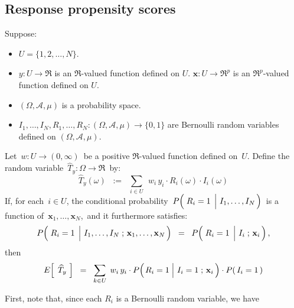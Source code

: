 

\subsection{Response propensity scores}

\begin{proposition}\label{PropnPropensityScore} 
\mbox{}\vskip 0.1cm
\noindent
Suppose:
\begin{itemize}
\item
	$U = \{1,2,\ldots,N\}$.
\item
	$y : U \longrightarrow \Re$ is an $\Re$-valued function defined on $U$.\;
	$\mathbf{x} : U \longrightarrow \Re^{p}$ is an $\Re^{p}$-valued function defined on $U$.
\item
	$(\Omega,\mathcal{A},\mu)$ is a probability space.
\item
	$I_{1},\ldots,I_{N},R_{1},\ldots,R_{N} : (\Omega,\mathcal{A},\mu) \longrightarrow \{0,1\}$
	are Bernoulli random variables defined on $(\Omega,\mathcal{A},\mu)$. 
\end{itemize}
Let \,$w : U \longrightarrow (0,\infty)$\, be a positive $\Re$-valued function defined on \,$U$.
Define the random variable \,$\widehat{T}_{y} : \Omega \longrightarrow \Re$\, by:
\begin{equation*}
\widehat{T}_{y}(\omega)
\;\; := \;\;
	\underset{i \in U}{\sum}\,\;w_{i}\,y_{i}\cdot R_{i}(\omega) \cdot I_{i}(\omega)
\end{equation*}
If, for each \,$i \in U$, the conditional probability
\,$P\!\left(\,\left.\overset{{\color{white}.}}{R_{i}}=1\;\,\right\vert\,I_{1},\ldots,I_{N}\,\right)$\,
is a function of \,$\mathbf{x}_{1},\ldots,\mathbf{x}_{N}$,\, and it furthermore satisfies:
\begin{equation*}
P\!\left(\,
	\left.\overset{{\color{white}.}}{R_{i}}=1\;\,\right\vert\,
	I_{1},\ldots,I_{N}\;;\,\mathbf{x}_{1},\ldots,\mathbf{x}_{N}
	\,\right)
\;\; = \;\;
	P\!\left(\,\left.\overset{{\color{white}.}}{R_{i}}=1\;\,\right\vert\,I_{i}\;;\,\mathbf{x}_{i}\,\right),
\end{equation*}
then
\begin{equation*}
E\!\left[\;\,\widehat{T}_{y}\,\,\right]
\;\; = \;\;
	\underset{k \in U}{\sum}\;\,w_{i}\,y_{i}
	\cdot P\!\left(\left.\overset{{\color{white}.}}{R_{i}}=1\;\right\vert\,I_{i}=1\;;\,\mathbf{x}_{i}\,\right) 
	\cdot P(\,I_{i}=1\,)
\end{equation*}
\end{proposition}
\proof
First, note that, since each $R_{i}$ is a Bernoulli random variable, we have
